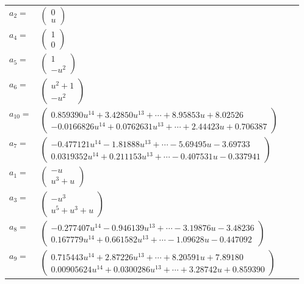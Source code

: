 \documentclass[1p]{elsarticle_modified}
\theoremstyle{definition}
\begin{document}
\begin{tabular}{m{7pt} m{180pt} m{7pt} m{180pt} }
\flushright $a_{2}=$&$\begin{pmatrix}0\\u\end{pmatrix}$ \\
\flushright $a_{4}=$&$\begin{pmatrix}1\\0\end{pmatrix}$ \\
\flushright $a_{5}=$&$\begin{pmatrix}1\\- u^2\end{pmatrix}$ \\
\flushright $a_{6}=$&$\begin{pmatrix}u^2+1\\- u^2\end{pmatrix}$ \\
\flushright $a_{10}=$&$\begin{pmatrix}0.859390 u^{14}+3.42850 u^{13}+\cdots+8.95853 u+8.02526\\-0.0166826 u^{14}+0.0762631 u^{13}+\cdots+2.44423 u+0.706387\end{pmatrix}$ \\
\flushright $a_{7}=$&$\begin{pmatrix}-0.477121 u^{14}-1.81888 u^{13}+\cdots-5.69495 u-3.69733\\0.0319352 u^{14}+0.211153 u^{13}+\cdots-0.407531 u-0.337941\end{pmatrix}$ \\
\flushright $a_{1}=$&$\begin{pmatrix}- u\\u^3+u\end{pmatrix}$ \\
\flushright $a_{3}=$&$\begin{pmatrix}- u^3\\u^5+u^3+u\end{pmatrix}$ \\
\flushright $a_{8}=$&$\begin{pmatrix}-0.277407 u^{14}-0.946139 u^{13}+\cdots-3.19876 u-3.48236\\0.167779 u^{14}+0.661582 u^{13}+\cdots-1.09628 u-0.447092\end{pmatrix}$ \\
\flushright $a_{9}=$&$\begin{pmatrix}0.715443 u^{14}+2.87226 u^{13}+\cdots+8.20591 u+7.89180\\0.00905624 u^{14}+0.0300286 u^{13}+\cdots+3.28742 u+0.859390\end{pmatrix}$ \\

\end{tabular}
\end{document}
